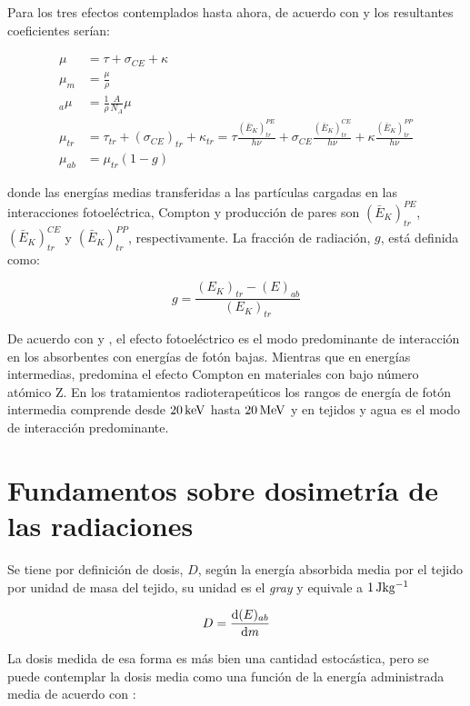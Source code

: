 \documentclass[12pt,letterpaper, oneside]{book}
\begin{document}
	 Para los tres efectos contemplados hasta ahora, de acuerdo con \cite{Podgorsak.2016} y \cite{IAEA.2005} los resultantes coeficientes serían:
	 
	 \begin{align}
	 	\mu&=\tau + \sigma_{CE} + \kappa\\
	 	\mu_m&=\frac{\mu}{\rho}\\
	 	_a\mu&=\frac{1}{\rho}\frac{A}{N_A}\mu\\
	 	\mu_{tr}&=\tau_{tr} + (\sigma_{CE})_{tr}+\kappa_{tr}=\tau\frac{\left(\bar{E}_K\right)_{tr}^{PE}}{h\nu} + \sigma_{CE}\frac{\left(\bar{E}_K\right)_{tr}^{CE}}{h\nu} + \kappa \frac{\left(\bar{E}_K\right)_{tr}^{PP}}{h\nu}\\
	 	\mu_{ab}&=\mu_{tr}(1-g)
	 \end{align}
	 
	 \noindent donde las energías medias transferidas a las partículas cargadas en las interacciones fotoeléctrica, Compton y producción de pares son $\left(\bar{E}_K\right)_{tr}^{PE}$, $\left(\bar{E}_K\right)_{tr}^{CE}$ y  $\left(\bar{E}_K\right)_{tr}^{PP}$, respectivamente. La fracción de radiación, $g$, está definida como:
	 
	 $$g=\frac{\left(E_K\right)_{tr}-\left(E\right)_{ab}}{\left(E_K\right)_{tr}}$$
	 
	 De acuerdo con \cite{Podgorsak.2016} y \cite{IAEA.2005}, el efecto fotoeléctrico es el modo predominante de interacción en los absorbentes con energías de fotón bajas. Mientras que en energías intermedias, predomina el efecto Compton en materiales con bajo número atómico Z. En los tratamientos radioterapeúticos los rangos de energía de fotón intermedia comprende desde $\unit[20]{keV}$ hasta $\unit[20]{MeV}$ y en tejidos y agua es el modo de interacción predominante\cite{Podgorsak.2016}. 
	 
	\section{Fundamentos sobre dosimetría de las radiaciones}
	Se tiene por definición de dosis, $D$, según \cite{Mayles.2007} la energía absorbida media por el tejido por unidad de masa del tejido, su unidad es el \textit{gray} y equivale a $\unit[1]{Jkg^{-1}}$
	
	$$D=\dv{(E)_{ab}}{m}$$
	
	La dosis medida de esa forma es más bien una cantidad estocástica, pero se puede contemplar la dosis media como una función de la energía administrada media de acuerdo con \cite{CARLSSON.1999}:
	
\end{document}
